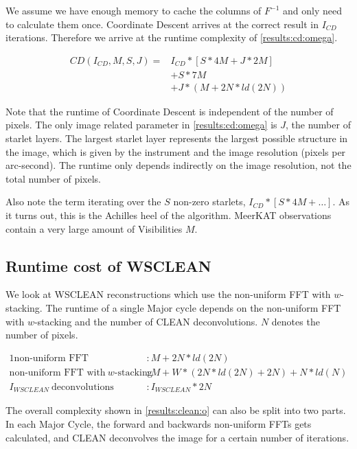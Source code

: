 We assume we have enough memory to cache the columns of $F^{-1}$ and only need to calculate them once. Coordinate Descent arrives at the correct result in $I_{CD}$ iterations. Therefore we arrive at the runtime complexity of \eqref{results:cd:omega}.

\begin{equation}\label{results:cd:omega}
\begin{aligned}
	CD(I_{CD}, M, S, J) = &I_{CD} * [S * 4M + J * 2M]\\
		&+  S*7M\\
		&+ J*(M + 2N*ld(2N))
\end{aligned}
\end{equation}

Note that the runtime of Coordinate Descent is independent of the number of pixels. The only image related parameter in \eqref{results:cd:omega} is $J$, the number of starlet layers. The largest starlet layer represents the largest possible structure in the image, which is given by the instrument and the image resolution (pixels per arc-second). The runtime only depends indirectly on the image resolution, not the total number of pixels.

Also note the term iterating over the $S$ non-zero starlets, $ I_{CD} * [S * 4M +\ldots]$. As it turns out, this is the Achilles heel of the algorithm. MeerKAT observations contain a very large amount of Visibilities $M$.

\subsection{Runtime cost of WSCLEAN}
We look at WSCLEAN reconstructions which use the non-uniform FFT with $w$-stacking. The runtime of a single Major cycle depends on the non-uniform FFT with $w$-stacking and the number of CLEAN deconvolutions. $N$ denotes the number of pixels.

\begin{alignat*}{1}
	\text{non-uniform FFT} &: M + 2N*ld(2N)\\
	\text{non-uniform FFT with} \:w\text{-stacking} &:M + W*(2N*ld(2N) + 2N) + N*ld(N)\\
	I_{WSCLEAN}\: \text{deconvolutions} &: I_{WSCLEAN}*2N
\end{alignat*}

The overall complexity shown in \eqref{results:clean:o} can also be split into two parts. In each Major Cycle, the forward and backwards non-uniform FFTs gets calculated, and CLEAN deconvolves the image for a certain number of iterations.

